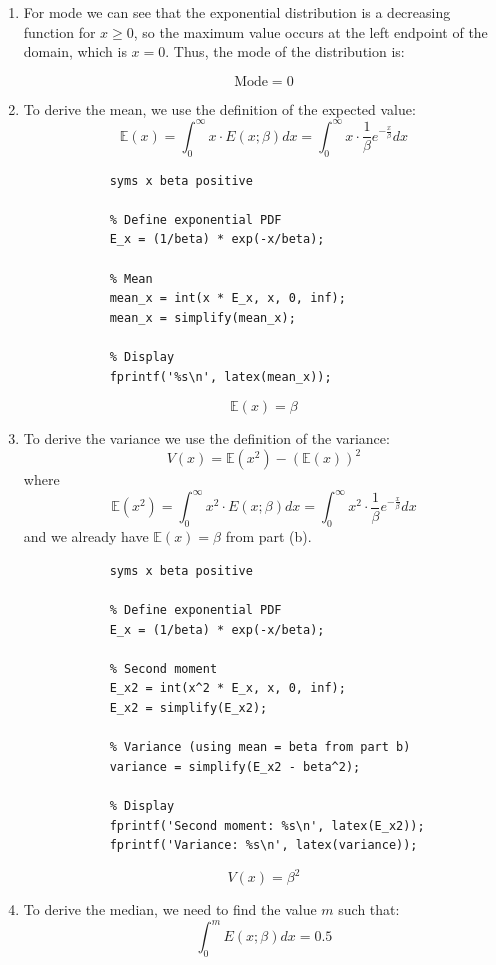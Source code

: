 \documentclass[10pt]{article}
\begin{document}
\divider

\begin{enumerate}[label=(\alph*)]
	\item For mode we can see that the exponential distribution is a decreasing function for $x \geq 0$, so the maximum value occurs at the left endpoint of the domain, which is $x = 0$. Thus, the mode of the distribution is:

	      \[ \boxed{\text{Mode} = 0} \]
	\item To derive the mean, we use the definition of the expected value:
	      \[ \mathbb{E}(x) = \int_0^\infty x \cdot E(x;\beta) dx = \int_0^\infty x \cdot \frac{1}{\beta} e^{-\frac{x}{\beta}} dx \]

	      \begin{verbatim}
			syms x beta positive

			% Define exponential PDF
			E_x = (1/beta) * exp(-x/beta);

			% Mean
			mean_x = int(x * E_x, x, 0, inf);
			mean_x = simplify(mean_x);

			% Display
			fprintf('%s\n', latex(mean_x));
		  \end{verbatim}

	      \[ \boxed{\mathbb{E}(x) = \beta} \]

	\item To derive the variance we use the definition of the variance:
	      \[ V(x) = \mathbb{E}(x^2) - (\mathbb{E}(x))^2 \]
	      where
	      \[ \mathbb{E}(x^2) = \int_0^\infty x^2 \cdot E(x;\beta) dx = \int_0^\infty x^2 \cdot \frac{1}{\beta} e^{-\frac{x}{\beta}} dx \]
	      and we already have $\mathbb{E}(x) = \beta$ from part (b).



	      \begin{verbatim}
			syms x beta positive

			% Define exponential PDF
			E_x = (1/beta) * exp(-x/beta);

			% Second moment
			E_x2 = int(x^2 * E_x, x, 0, inf);
			E_x2 = simplify(E_x2);

			% Variance (using mean = beta from part b)
			variance = simplify(E_x2 - beta^2);

			% Display
			fprintf('Second moment: %s\n', latex(E_x2));
			fprintf('Variance: %s\n', latex(variance));
		  \end{verbatim}

	      \[ \boxed{V(x) = \beta^2} \]

	\item To derive the median, we need to find the value $m$ such that:
	      \[ \int_0^m E(x;\beta) dx = 0.5 \]


\end{enumerate}
\end{document}
